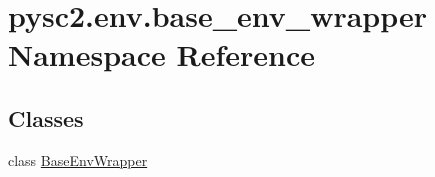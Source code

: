 \hypertarget{namespacepysc2_1_1env_1_1base__env__wrapper}{}\section{pysc2.\+env.\+base\+\_\+env\+\_\+wrapper Namespace Reference}
\label{namespacepysc2_1_1env_1_1base__env__wrapper}
\subsection*{Classes}
\begin{DoxyCompactItemize}
\item 
class \mbox{\hyperlink{classpysc2_1_1env_1_1base__env__wrapper_1_1_base_env_wrapper}{Base\+Env\+Wrapper}}
\end{DoxyCompactItemize}
